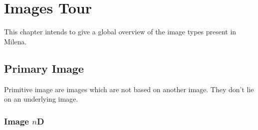 \chapter{Images Tour}

This chapter intends to give a global overview of the image types present in
Milena.



\section{Primary Image}

Primitive image are images which are not based on another image.
They don't lie on an underlying image.


\subsection{Image $n$D}

